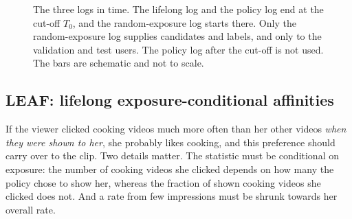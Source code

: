 \begin{figure}[tbp]
\centering
{}
\caption{The three logs in time. The lifelong log and the policy log end at the cut-off $T_0$, and the random-exposure log starts
  there. Only the random-exposure log supplies candidates and labels, and only to the validation and test users. The policy log after
  the cut-off is not used. The bars are schematic and not to scale.}
\label{fig:timeline}
\end{figure}

\subsection{LEAF: lifelong exposure-conditional affinities}
\label{sec:method-leaf}

If the viewer clicked cooking videos much more often than her other videos \emph{when they were shown to her}, she probably likes
cooking, and this preference should carry over to the clip. Two details matter. The statistic must be conditional on exposure: the
number of cooking videos she clicked depends on how many the policy chose to show her, whereas the fraction of shown cooking videos she
clicked does not. And a rate from few impressions must be shrunk towards her overall rate.

